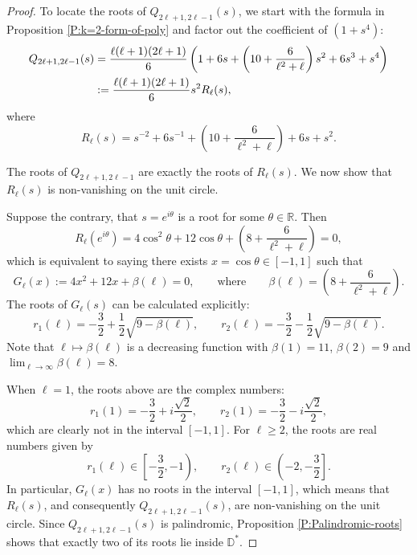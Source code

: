 \documentclass[letterpaper,11pt,reqno]{amsart}
\theoremstyle{plain}
\theoremstyle{definition}
\theoremstyle{remark}
\theoremstyle{remark}
\numberwithin{equation}{section}
\newcommand{\D}{{\mathbb D}}
\newcommand{\R}{{\mathbb R}}
\begin{document}
\begin{proof}
To locate the roots of $Q_{2\ell+1,2\ell-1}(s)$, we start with the formula in Proposition \ref{P:k=2-form-of-poly} and factor out the coefficient of $(1+s^4)$:
\begin{align}
Q_{2\ell+1,2\ell-1}(s) 
&= \frac{\ell(\ell+1)(2\ell+1)}{6} \left( 1 + 6s + \left(10 + \frac{6}{\ell^2+\ell} \right) s^2 + 6s^3 + s^4 \right) \notag \\
&:= \frac{\ell(\ell+1)(2\ell+1)}{6} s^2 R_\ell(s), \label{E:Q_k=2_step1}
\end{align}
where
\begin{equation}\label{E:def-R_l(s)}
R_\ell(s) =  s^{-2} + 6 s^{-1} + \left(10 + \frac{6}{\ell^2+\ell} \right) + 6s + s^2.
\end{equation}

The roots of $Q_{2\ell+1,2\ell-1}$ are exactly the roots of $R_\ell(s)$. 
We now show that $R_\ell(s)$ is non-vanishing on the unit circle.

Suppose the contrary, that $s = e^{i\theta}$ is a root for some $\theta \in \R$. 
Then
\begin{equation}
R_\ell(e^{i\theta}) = 4\cos^2\theta + 12 \cos\theta  + \left(8 + \frac{6}{\ell^2+\ell} \right) = 0,
\end{equation}
which is equivalent to saying there exists $x = \cos\theta \in [-1,1]$ such that
\begin{equation*}
G_\ell(x) := 4x^2 + 12 x  + \beta(\ell) = 0, \qquad \mathrm{where} \qquad \beta(\ell) =  \left(8 + \frac{6}{\ell^2+\ell} \right).
\end{equation*}
The roots of $G_\ell(s)$ can be calculated explicitly:
\begin{equation}
r_1(\ell) = -\frac{3}{2} + \frac{1}{2}\sqrt{9-\beta(\ell)}, \qquad 
r_2(\ell) = -\frac{3}{2} - \frac{1}{2}\sqrt{9-\beta(\ell)}.
\end{equation}
Note that $\ell \mapsto \beta(\ell)$ is a decreasing function with $\beta(1) = 11$, $\beta(2)=9$ and $\lim_{\ell \to \infty} \beta(\ell) = 8$.

When $\ell = 1$, the roots above are the complex numbers:
\begin{equation*}
r_1(1) = -\frac{3}{2} + i\frac{\sqrt{2}}{2}, \qquad r_2(1) = -\frac{3}{2} - i\frac{\sqrt{2}}{2},
\end{equation*}
which are clearly not in the interval $[-1,1]$.
For $\ell \ge 2$, the roots are real numbers given by
\begin{equation*}
r_1(\ell) \in \left[ -\frac{3}{2},-1 \right), \qquad r_2(\ell) \in \left(-2,-\frac{3}{2} \right].
\end{equation*}
In particular, $G_\ell(x)$ has no roots in the interval $[-1,1]$, which means that $R_\ell(s)$, and consequently $Q_{2\ell+1,2\ell-1}(s)$, are non-vanishing on the unit circle.
Since $Q_{2\ell+1,2\ell-1}(s)$ is palindromic, Proposition \ref{P:Palindromic-roots} shows that exactly two of its roots lie inside $\D^*$.
\end{proof}
\end{document}

